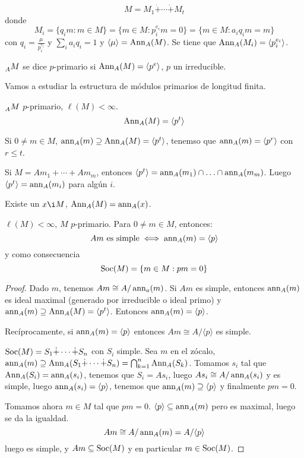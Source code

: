 
\[
  M=M_1\dot{+}\cdots\dot{+} M_t
\]
donde
\[
  M_i=\{q_i m: m\in M\}=\{m\in M: p_i^{e_i} m=0\}=\{m\in M:
  a_i q_i m = m\}
\]
con \(q_i=\frac{\mu}{p_i^{e_i}}\) y \(\sum_i a_i q_i=1\)
y \(\langle \mu\rangle=\operatorname{Ann}_A(M)\). Se tiene que
\(\operatorname{Ann}_A(M_i)=\langle p_i^{e_i}\rangle\).

\begin{df}
  \(\prescript{}{A}{M}\) se dice \(p\)-primario si
  \(\operatorname{Ann}_A(M)=\langle p^e\rangle\), \(p\) un irreducible.
\end{df}

Vamos a estudiar la estructura de módulos primarios de longitud finita.

\begin{obs}
  \(\prescript{}{A}{M}\) \(p\)-primario, \(\ell(M)<\infty\).
  \[
    \operatorname{Ann}_A(M)=\langle p^t\rangle
  \]

  Si \(0\neq m\in M\), \(\operatorname{ann}_A(m)\supseteq \operatorname{Ann}_A(M)=\langle p^t
  \rangle\), tenemso que \(\operatorname{ann}_A(m)=\langle p^r\rangle \)
  con \(r\le t\).

  Si \(M=Am_1+\cdots+Am_m\), entonces \(\langle p^t\rangle
  =\operatorname{ann}_A(m_1)\cap\ldots\cap\operatorname{ann}_A(m_m)\). Luego
  \(\langle p^t\rangle =\operatorname{ann}_A(m_i)\) para algún \(i\).
\end{obs}

\begin{cor}
  Existe un \(x\i M\), \(\operatorname{Ann}_A(M)=\operatorname{ann}_A(x)\).
\end{cor}

\begin{lema}
  \(\ell(M)<\infty\), \(M\) \(p\)-primario. Para \(0\neq m\in M\),
  entonces:
  \[
    Am\textrm{ es simple} \iff \operatorname{ann}_A(m)=\langle p\rangle
  \]
  y como consecuencia
  \[
    \operatorname{Soc}(M)=\{m\in M: pm=0\}
  \]
\end{lema}
\begin{proof}
  Dado \(m\), tenemos \(Am\cong A/\operatorname{ann}_a(m)\). Si \(Am\) es simple,
  entonces \(\operatorname{ann}_A(m)\) es ideal maximal (generado por irreducible o ideal
  primo) y
  \(\operatorname{ann}_A(m)\supseteq\operatorname{Ann}_A(M)=\langle p^t\rangle\).
  Entonces \(\operatorname{ann}_A(m)=\langle p\rangle\).

  Recíprocamente, si \(\operatorname{ann}_A(m)=\langle p\rangle\) entonces
  \(Am\cong A/\langle p\rangle\) es simple.

  \(\operatorname{Soc}(M)=S_1\dot{+}\cdots\dot{+}S_n\) con \(S_i\) simple.
  Sea \(m\) en el zócalo, \(\operatorname{ann}_A(m)
  \supseteq\operatorname{Ann}_A(S_1\dot{+}\cdots\dot{+}S_n)=
  \bigcap_{k=1}^{n} \operatorname{Ann}_A(S_k)\). Tomamos \(s_i\) tal que
  \(\operatorname{Ann}_A(S_i)=\operatorname{ann}_A(s_i)\), tenemos que \(S_i=As_i\), luego
  \(As_i\cong A/\operatorname{ann}_A(s_i)\) y es simple, luego
  \(\operatorname{ann}_A(s_i)=\langle p\rangle\),
  tenemos que \(\operatorname{ann}_A(m)\supseteq\langle p\rangle\) y finalmente
  \(pm=0\).

  Tomamos ahora \(m\in M\) tal que \(pm=0\). \(\langle p\rangle
  \subseteq\operatorname{ann}_A(m)\) pero es maximal, luego se da la igualdad.
  \[
    Am\cong A/\operatorname{ann}_A(m)= A/\langle p\rangle
  \]
  luego es simple, y \(Am\subseteq\operatorname{Soc}(M)\) y en particular
  \(m\in\operatorname{Soc}(M)\).

\end{proof}


